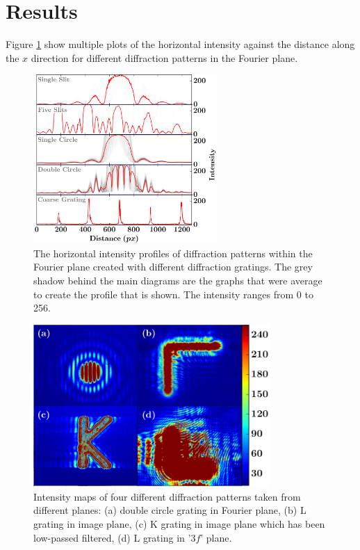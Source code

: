 \documentclass[twocolumn]{revtex4}
\begin{document}
\section{Results}
\vspace{-2ex}
Figure \ref{horizontal_profiles} show multiple plots of the horizontal intensity against the distance along the $x$ direction for different diffraction patterns in the Fourier plane.
\begin{figure}[!h]
\begin{center}
\includegraphics[width=7cm]{results/horizontal_intensity_profiles}
\caption[]{The horizontal intensity profiles of diffraction patterns within the Fourier plane created with different diffraction gratings. The grey shadow behind the main diagrams are the graphs that were average to create the profile that is shown. The intensity ranges from 0 to 256.}
\label{horizontal_profiles}
\end{center}
\end{figure}

\begin{figure}[!h]
\begin{center}
\includegraphics[width=9cm]{results/collage}
\caption[]{Intensity maps of four different diffraction patterns taken from different planes: (a) double circle grating in Fourier plane, (b) L grating in image plane, (c) K grating in image plane which has been low-passed filtered, (d) L grating in '$3f$' plane.}
\end{center}
\end{figure}
\end{document}
